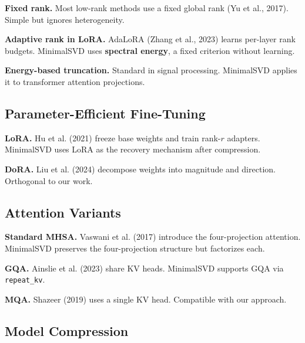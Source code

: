 \textbf{Fixed rank.} Most low-rank methods use a fixed global rank (Yu et al., 
2017). Simple but ignores heterogeneity.

\textbf{Adaptive rank in LoRA.} AdaLoRA (Zhang et al., 2023) learns per-layer 
rank budgets. MinimalSVD uses \textbf{spectral energy}, a fixed criterion 
without learning.

\textbf{Energy-based truncation.} Standard in signal processing. MinimalSVD 
applies it to transformer attention projections.

\subsection{Parameter-Efficient Fine-Tuning}

\textbf{LoRA.} Hu et al. (2021) freeze base weights and train rank-$r$ adapters. 
MinimalSVD uses LoRA as the recovery mechanism after compression.

\textbf{DoRA.} Liu et al. (2024) decompose weights into magnitude and direction. 
Orthogonal to our work.

\subsection{Attention Variants}

\textbf{Standard MHSA.} Vaswani et al. (2017) introduce the four-projection 
attention. MinimalSVD preserves the four-projection structure but factorizes 
each.

\textbf{GQA.} Ainslie et al. (2023) share KV heads. MinimalSVD supports GQA via 
\texttt{repeat\_kv}.

\textbf{MQA.} Shazeer (2019) uses a single KV head. Compatible with our approach.

\subsection{Model Compression}

